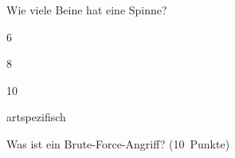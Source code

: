 \documentclass[addpoints,a4paper,ngerman,10pt,answers]{exam}
\begin{document}
\begin{questions}
\begin{checkboxes}
\end{checkboxes}
\vspace{1cm}
\question[1]\parbox[t][][t]{0.68\textwidth}{Wie viele Beine hat eine Spinne?}
\begin{checkboxes}
\choice \parbox[t][][t]{0.5\textwidth}{6}
\correctchoice \parbox[t][][t]{0.6\textwidth}{8}
\choice \parbox[t][][t]{0.5\textwidth}{10}
\choice \parbox[t][][t]{0.5\textwidth}{artspezifisch}

\end{checkboxes}
\vspace{1cm}


\clearpage
{}
\addtocounter{counter}{1}
\vspace{.5cm}
\question[10] \parbox[t][][t]{0.68\textwidth}{Was ist ein Brute-Force-Angriff?
\linebreak(10\ Punkte)}


\end{questions}
\end{document}
